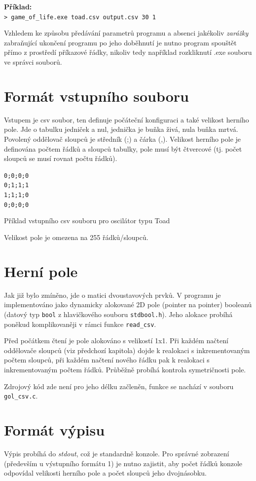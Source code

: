 \textbf{Příklad:}\\
\texttt{> game{\_}of{\_}life.exe toad.csv output.csv 30 1}

Vzhledem ke způsobu předávání parametrů programu a absenci jakékoliv \textit{zarážky} zabraňující ukončení programu po jeho doběhnutí je nutno program spouštět přímo z prostředí příkazové řádky, nikoliv tedy například rozkliknutí .exe souboru ve správci souborů.

\section{Formát vstupního souboru}
\label{sec:format}
Vstupem je csv soubor, ten definuje počáteční konfiguraci a také velikost herního pole. Jde o tabulku jedniček a nul, jednička je buňka živá, nula buňka mrtvá. Povolený oddělovač sloupců je středník (;) a čárka (,). Velikost herního pole je definována počtem řádků a sloupců tabulky, pole musí být čtvercové (tj. počet sloupců se musí rovnat počtu řádků).

\begin{code}
\centering
\texttt{0;0;0;0\\0;1;1;1\\1;1;1;0\\0;0;0;0}
\caption{Příklad vstupního csv souboru pro oscilátor typu Toad}
\label{code:csv}
Velikost pole je omezena na 255 řádků/sloupců.
\end{code}


\section{Herní pole}
\label{sec:gamefield}
Jak již bylo zmíněno, jde o matici dvoustavových prvků. V programu je implementováno jako dynamicky alokované 2D pole (pointer na pointer) booleanů (datový typ \texttt{bool} z hlavičkového souboru \texttt{stdbool.h}). Jeho alokace probíhá poněkud komplikovaněji v rámci funkce \texttt{read{\_}csv}.

Před počátkem čtení je pole alokováno s velikostí 1x1. Při každém načtení oddělovače sloupců (viz předchozí kapitola) dojde k realokaci s inkrementovaným počtem sloupců, při každém načtení nového řádku pak k realokaci s inkrementovaným počtem řádků. Průběžně probíhá kontrola symetričnosti pole.

Zdrojový kód zde není pro jeho délku začleněn, funkce se nachází v souboru \texttt{gol{\_}csv.c}.

\section{Formát výpisu}
\label{sec:vypis}
Výpis probíhá do \textit{stdout}, což je standardně konzole. Pro správné zobrazení (především u výstupního formátu 1) je nutno zajistit, aby počet řádků konzole odpovídal velikosti herního pole a počet sloupců jeho dvojnásobku.


